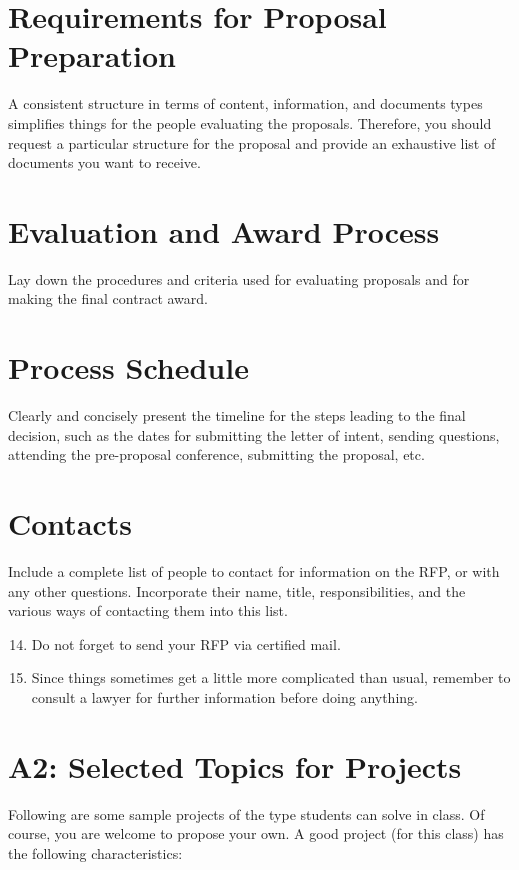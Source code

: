 \documentclass[10pt]{article}
\begin{document}
\section{Requirements for Proposal Preparation}
A consistent structure in terms of content, information, and documents types simplifies things for the people evaluating the proposals. Therefore, you should request a particular structure for the proposal and provide an exhaustive list of documents you want to receive.

\section{Evaluation and Award Process}
Lay down the procedures and criteria used for evaluating proposals and for making the final contract award.

\section{Process Schedule}
Clearly and concisely present the timeline for the steps leading to the final decision, such as the dates for submitting the letter of intent, sending questions, attending the pre-proposal conference, submitting the proposal, etc.

\section{Contacts}
Include a complete list of people to contact for information on the RFP, or with any other questions. Incorporate their name, title, responsibilities, and the various ways of contacting them into this list.

\begin{enumerate}
  \setcounter{enumi}{13}
  \item Do not forget to send your RFP via certified mail.

  \item Since things sometimes get a little more complicated than usual, remember to consult a lawyer for further information before doing anything.

\end{enumerate}
\section{A2: Selected Topics for Projects}
Following are some sample projects of the type students can solve in class. Of course, you are welcome to propose your own. A good project (for this class) has the following characteristics:
\end{document}
